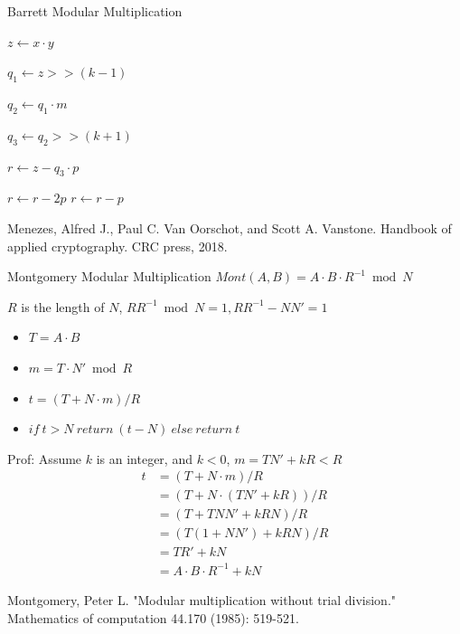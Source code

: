 \documentclass{beamer}
\begin{document}
\begin{frame}{Barrett Modular Multiplication}
	\begin{algorithmic}

		\STATE $z \leftarrow x \cdot y$

		\STATE $q_1 \leftarrow z >> (k-1)$

		\STATE $q_2 \leftarrow q_1 \cdot m$

		\STATE $q_3 \leftarrow q_2 >> (k+1)$

		\STATE $r \leftarrow z - q_3 \cdot p$

		\STATE $r \leftarrow r - 2p$
		\STATE$r \leftarrow r - p$
		\ENDIF
	\end{algorithmic}
	\alert{Menezes, Alfred J., Paul C. Van Oorschot, and Scott A. Vanstone. Handbook of applied cryptography. CRC press, 2018.}
\end{frame}

\begin{frame}{Montgomery Modular Multiplication}
	$Mont(A,B) = A \cdot B \cdot R^{-1} \bmod N$

	$R$ is the length of $N$, $RR^{-1} \bmod N = 1, RR^{-1} - NN' = 1$


	\begin{itemize}
		\item $T = A \cdot B$
		\item $m =  T \cdot N' \bmod R$
		\item $t = (T + N\cdot m)/R$
		\item $if \ t>N \ return \ (t-N)\  else \  return \ t$
	\end{itemize}

	Prof: Assume $k$ is an integer, and $k < 0$, $m = TN'+kR < R$
	\begin{equation}\nonumber
		\begin{aligned}
			t & = (T + N\cdot m)/R            \\
			  & = (T + N\cdot(TN'+kR)) / R    \\
			  & = (T + TNN' + kRN)/R          \\
			  & = (T(1+NN')+kRN)/R            \\
			  & = TR' + kN                    \\
			  & = A \cdot B \cdot R^{-1} + kN
		\end{aligned}
	\end{equation}

	\alert{Montgomery, Peter L. "Modular multiplication without trial division." Mathematics of computation 44.170 (1985): 519-521.}
\end{frame}
\end{document}
